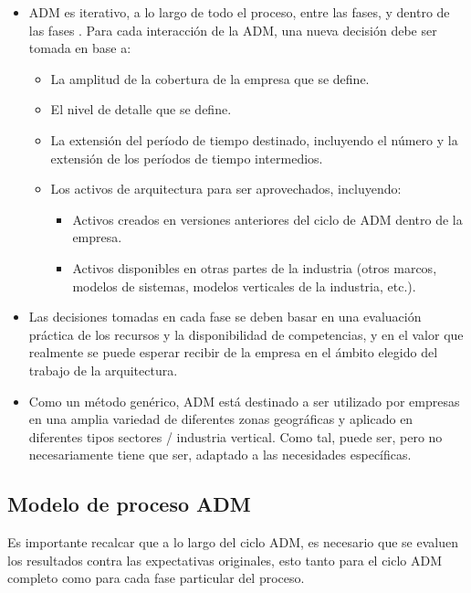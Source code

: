 \begin{itemize}
	\item ADM es iterativo, a lo largo de todo el proceso, entre las fases, y dentro de las fases . Para cada interacción de la ADM, una nueva decisión debe ser tomada en base a:
	\begin{itemize}
		\item La amplitud de la cobertura de la empresa que se define.
		\item El nivel de detalle que se define.
		\item La extensión del período de tiempo destinado, incluyendo el número y la extensión de los períodos de tiempo intermedios.
		\item Los activos de arquitectura para ser aprovechados, incluyendo:
		\begin{itemize}
			\item Activos creados en versiones anteriores del ciclo de ADM dentro de la empresa.
			\item Activos disponibles en otras partes de la industria (otros marcos, modelos de sistemas, modelos verticales de la industria, etc.).
		\end{itemize}
	\end{itemize}
	\item Las decisiones tomadas en cada fase se deben basar en una evaluación práctica de los recursos y la disponibilidad de competencias, y en el valor que realmente se puede esperar recibir de la empresa en el ámbito elegido del trabajo de la arquitectura.
	\item Como un método genérico, ADM está destinado a ser utilizado por empresas en una amplia variedad de diferentes zonas geográficas y aplicado en diferentes tipos sectores / industria vertical. Como tal, puede ser, pero no necesariamente tiene que ser, adaptado a las necesidades específicas.
\end{itemize}

\newpage
\subsection{Modelo de proceso ADM}

Es importante recalcar que a lo largo del ciclo ADM, es necesario que se evaluen los resultados contra las expectativas originales, esto tanto para el ciclo ADM completo como para cada fase particular del proceso.

